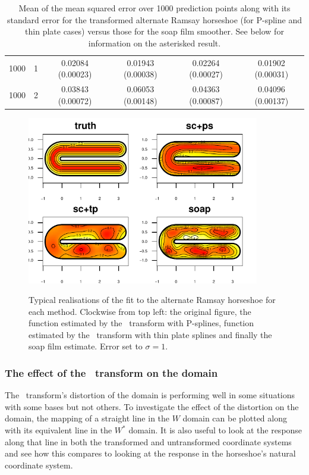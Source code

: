 \begin{table}[ht]
\begin{tabular}{c c c c c c}
1000 & 1 & 0.02084 (0.00023) & 0.01943 (0.00038) & 0.02264 (0.00027) & 0.01902 (0.00031) \\ 
1000 & 2 & 0.03843 (0.00072) & 0.06053 (0.00148) & 0.04363 (0.00087) & 0.04096 (0.00137) \\ 
\end{tabular}
\label{scaltramsayresultstable}
\caption{Mean of the mean squared error over 1000 prediction points along with its standard error for the transformed alternate Ramsay horseshoe (for P-spline and thin plate cases) versus those for the soap film smoother. See below for information on the asterisked result.}
\end{table}

\begin{figure}
\centering
\includegraphics[width=4in]{sc/figs/altramsaycomp.pdf}\\
\caption{Typical realisations of the fit to the alternate Ramsay horseshoe for each method. Clockwise from top left: the original figure, the function estimated by the \sch\ transform with P-splines, function estimated by the \sch\ transform with thin plate splines and finally the soap film estimate. Error set to $\sigma=1$.}
\label{altramsaycomp}
\end{figure}


\subsubsection{The effect of the \sch\ transform on the domain}

The \sch\ transform's distortion of the domain is performing well in some situations with some bases but not others. To investigate the effect of the distortion on the domain, the mapping of a straight line in the $W$ domain can be plotted along with its equivalent line in the $W^*$ domain. It is also useful to look at the response along that line in both the transformed and untransformed coordinate systems and see how this compares to looking at the response in the horseshoe's natural coordinate system.

